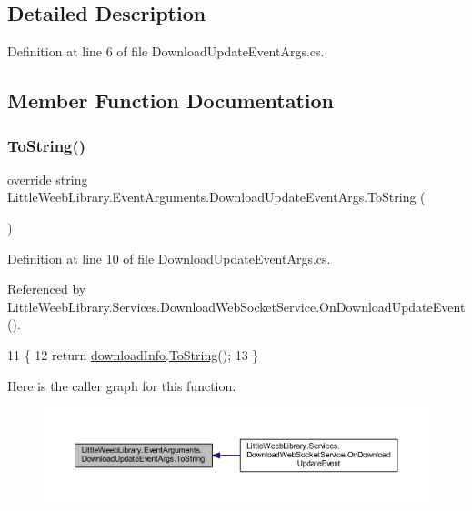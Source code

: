 \subsection{Detailed Description}


Definition at line 6 of file Download\+Update\+Event\+Args.\+cs.



\subsection{Member Function Documentation}
\mbox{\label{class_little_weeb_library_1_1_event_arguments_1_1_download_update_event_args_ac81037572c354a14f1d35b654ac24b5a}} 
\subsubsection{\texorpdfstring{To\+String()}{ToString()}}
{\footnotesize\ttfamily override string Little\+Weeb\+Library.\+Event\+Arguments.\+Download\+Update\+Event\+Args.\+To\+String (\begin{DoxyParamCaption}{ }\end{DoxyParamCaption})}



Definition at line 10 of file Download\+Update\+Event\+Args.\+cs.



Referenced by Little\+Weeb\+Library.\+Services.\+Download\+Web\+Socket\+Service.\+On\+Download\+Update\+Event().


\begin{DoxyCode}
11         \{
12             \textcolor{keywordflow}{return} \mbox{\hyperlink{class_little_weeb_library_1_1_event_arguments_1_1_download_update_event_args_a6f920facf63fcef57167ccf645ed42bf}{downloadInfo}}.\mbox{\hyperlink{class_little_weeb_library_1_1_models_1_1_json_download_info_af36cbb3251b0efcd80a45f1fef89f5c9}{ToString}}();
13         \}
\end{DoxyCode}
Here is the caller graph for this function\+:\nopagebreak
\begin{figure}[H]
\begin{center}
\leavevmode
\includegraphics[width=350pt]{class_little_weeb_library_1_1_event_arguments_1_1_download_update_event_args_ac81037572c354a14f1d35b654ac24b5a_icgraph}
\end{center}
\end{figure}


